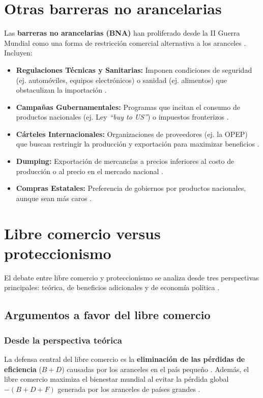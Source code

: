 \section{Otras barreras no arancelarias}
Las \textbf{barreras no arancelarias (BNA)} han proliferado desde la II Guerra Mundial como una forma de restricción comercial alternativa a los aranceles . Incluyen:
\begin{itemize}
    \item \textbf{Regulaciones Técnicas y Sanitarias:} Imponen condiciones de seguridad (ej. automóviles, equipos electrónicos) o sanidad (ej. alimentos) que obstaculizan la importación .
    \item \textbf{Campañas Gubernamentales:} Programas que incitan el consumo de productos nacionales (ej. Ley \textit{“buy to US”}) o impuestos fronterizos .
    \item \textbf{Cárteles Internacionales:} Organizaciones de proveedores (ej. la OPEP) que buscan restringir la producción y exportación para maximizar beneficios .
    \item \textbf{Dumping:} Exportación de mercancías a precios inferiores al costo de producción o al precio en el mercado nacional .
    \item \textbf{Compras Estatales:} Preferencia de gobiernos por productos nacionales, aunque sean más caros .
\end{itemize}

\section{Libre comercio versus proteccionismo}
El debate entre libre comercio y proteccionismo se analiza desde tres perspectivas principales: teórica, de beneficios adicionales y de economía política .

\subsection{Argumentos a favor del libre comercio}

\subsubsection{Desde la perspectiva teórica}
La defensa central del libre comercio es la \textbf{eliminación de las pérdidas de eficiencia} ($B+D$) causadas por los aranceles en el país pequeño . Además, el libre comercio maximiza el bienestar mundial al evitar la pérdida global $-(B+D+F)$ generada por los aranceles de países grandes .

